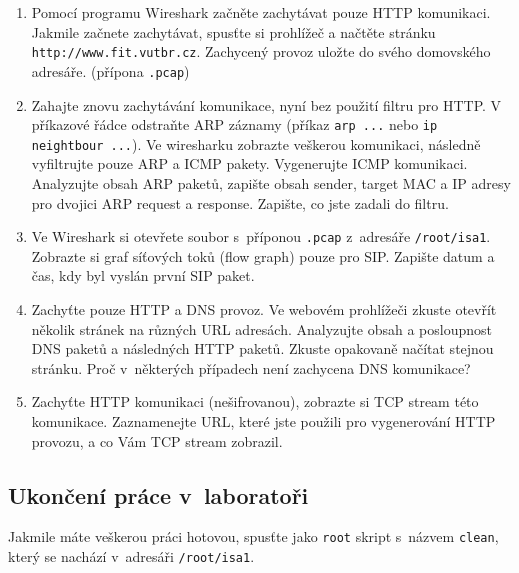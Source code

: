 \begin{enumerate}
\item Pomocí programu Wireshark začněte zachytávat pouze HTTP komunikaci. Jakmile začnete zachytávat, spusťte si prohlížeč a načtěte stránku \texttt{http://www.fit.vutbr.cz}. Zachycený provoz uložte do svého domovského adresáře. (přípona \texttt{.pcap})
\item Zahajte znovu zachytávání komunikace, nyní bez použití filtru pro HTTP. V příkazové řádce odstraňte ARP záznamy (příkaz \texttt{arp ...} nebo \texttt{ip neightbour ...}). Ve wiresharku zobrazte veškerou komunikaci, následně vyfiltrujte pouze ARP a ICMP pakety. Vygenerujte ICMP komunikaci. Analyzujte obsah ARP paketů, zapište obsah sender, target MAC a IP adresy pro dvojici ARP request a response. Zapište, co jste zadali do filtru.
\item Ve Wireshark si otevřete soubor s~příponou \texttt{.pcap} z~adresáře \texttt{/root/isa1}. Zobrazte si graf síťových toků (flow graph) pouze pro SIP. Zapište datum a čas, kdy byl vyslán první SIP paket.
\item Zachyťte pouze HTTP a DNS provoz. Ve webovém prohlížeči zkuste otevřít několik stránek na různých URL adresách. Analyzujte obsah a posloupnost DNS paketů a následných HTTP paketů. Zkuste opakovaně načítat stejnou stránku. Proč v~některých případech není zachycena DNS komunikace?
\item Zachyťte HTTP komunikaci (nešifrovanou), zobrazte si TCP stream této komunikace. Zaznamenejte URL, které jste použili pro vygenerování HTTP provozu, a co Vám TCP stream zobrazil.
\end{enumerate}

\subsection{Ukončení práce v~laboratoři}
Jakmile máte veškerou práci hotovou, spusťte jako \texttt{root} skript s~názvem \texttt{clean}, který se nachází v~adresáři \texttt{/root/isa1}.
